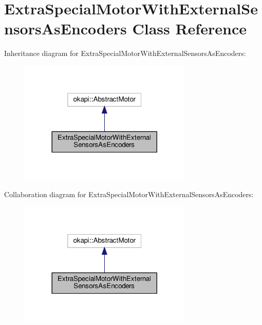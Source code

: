 \hypertarget{classExtraSpecialMotorWithExternalSensorsAsEncoders}{}\section{Extra\+Special\+Motor\+With\+External\+Sensors\+As\+Encoders Class Reference}
\label{classExtraSpecialMotorWithExternalSensorsAsEncoders}


Inheritance diagram for Extra\+Special\+Motor\+With\+External\+Sensors\+As\+Encoders\+:\nopagebreak
\begin{figure}[H]
\begin{center}
\leavevmode
\includegraphics[width=233pt]{classExtraSpecialMotorWithExternalSensorsAsEncoders__inherit__graph}
\end{center}
\end{figure}


Collaboration diagram for Extra\+Special\+Motor\+With\+External\+Sensors\+As\+Encoders\+:\nopagebreak
\begin{figure}[H]
\begin{center}
\leavevmode
\includegraphics[width=233pt]{classExtraSpecialMotorWithExternalSensorsAsEncoders__coll__graph}
\end{center}
\end{figure}
